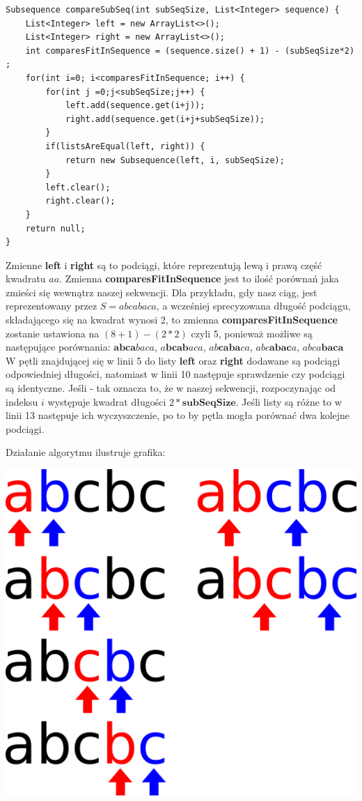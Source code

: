 \documentclass[document]{xmgr}
\begin{document}
\begin{lstlisting}[frame=single]
Subsequence compareSubSeq(int subSeqSize, List<Integer> sequence) {
	List<Integer> left = new ArrayList<>();
	List<Integer> right = new ArrayList<>();
	int comparesFitInSequence = (sequence.size() + 1) - (subSeqSize*2) ;
	for(int i=0; i<comparesFitInSequence; i++) {
		for(int j =0;j<subSeqSize;j++) {
			left.add(sequence.get(i+j));
			right.add(sequence.get(i+j+subSeqSize));
		}
		if(listsAreEqual(left, right)) {
			return new Subsequence(left, i, subSeqSize);
		}
		left.clear();
		right.clear();
	}
	return null;
}
\end{lstlisting}
Zmienne \textbf{left} i \textbf{right} są to podciągi, które reprezentują lewą i prawą część kwadratu $aa$. Zmienna \textbf{comparesFitInSequence} jest to ilość porównań jaka zmieści się wewnątrz naszej sekwencji. Dla przykładu, gdy nasz ciąg, jest reprezentowany przez $S = abcabaca$, a wcześniej sprecyzowana długość podciągu, składającego się na kwadrat wynosi 2, to zmienna \textbf{comparesFitInSequence} zostanie ustawiona na $(8 + 1) - (2 * 2)$ czyli 5, ponieważ możliwe są następujące porównania: $\textbf{abca}baca$, $a\textbf{bcab}aca$, $ab\textbf{caba}ca$, $abc\textbf{abac}a$, $abca\textbf{baca}$
W pętli znajdującej się w linii 5 do listy \textbf{left} oraz \textbf{right} dodawane są podciągi odpowiedniej długości, natomiast w linii 10 następuje sprawdzenie czy podciągi są identyczne. Jeśli - tak oznacza to, że w naszej sekwencji, rozpoczynając od indeksu $i$ występuje kwadrat długości $2 * \textbf{subSeqSize}$. Jeśli listy są różne to w linii 13 następuje ich wyczyszczenie, po to by pętla mogła porównać dwa kolejne podciągi.

Działanie algorytmu ilustruje grafika:

\begin{center}
\includegraphics[scale = 0.2]{images/squareFinding}
\end{center}
\end{document}
